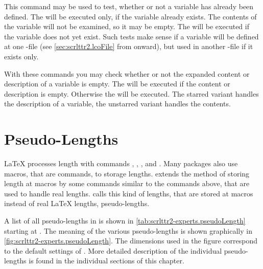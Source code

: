 \begin{Declaration}
\end{Declaration}
This command may be used to test, whether
or not a variable has already been defined. The  will be
executed only, if the variable already exists. The contents of the variable
will not be examined, so it may be empty. The  will be
executed if the variable does not yet exist. Such tests make sense if a
variable will be defined at one
-file (see
\autoref{sec:scrlttr2.lcoFile} from 
onward), but used in another -file if it exists only.%
%
\EndIndexGroup


\begin{Declaration}
\end{Declaration}
With these commands you may check
whether or not the expanded content or description of a variable is
empty. The  will be executed if the content or
description is empty. Otherwise the  will be
executed. The starred variant handles the description of a variable,
the unstarred variant handles the contents.%
\EndIndexGroup
%
\EndIndexGroup


\section{Pseudo-Lengths}

\BeginIndexGroup
{}
\LaTeX{} processes length with commands , ,
, and . Many packages also use
macros, that are commands, to storage lengths. \KOMAScript{} extends the
method of storing length at macros by some commands similar to the commands
above, that are used to handle real lengths. \KOMAScript calls this kind of
lengths, that are stored at macros instead of real \LaTeX{} lengths,
pseudo-lengths.

A list of all pseudo-lengths in  is shown in
\autoref{tab:scrlttr2-experts.pseudoLength} starting at
. The meaning of the various
pseudo-lengths is shown graphically in
\autoref{fig:scrlttr2-experts.pseudoLength}. The dimensions used in the figure
correspond to the default settings of . More detailed
description of the individual pseudo-lengths is found in the individual
sections of this chapter.

